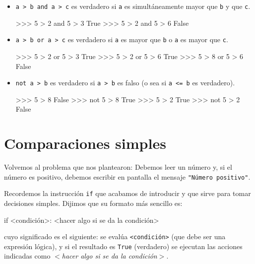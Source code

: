 \begin{itemize}
\item \lstinline!a > b and a > c! es verdadero si \lstinline!a! es
simultáneamente mayor que \lstinline!b! y que \lstinline!c!.

\begin{codigo-python-sn}
>>> 5 > 2 and 5 > 3
True
>>> 5 > 2 and 5 > 6
False
\end{codigo-python-sn}

\item \lstinline!a > b or a > c! es verdadero si \lstinline!a! es mayor que
\lstinline!b! o \lstinline!a! es mayor que \lstinline!c!.

\begin{codigo-python-sn}
>>> 5 > 2 or 5 > 3
True
>>> 5 > 2 or 5 > 6
True
>>> 5 > 8 or 5 > 6
False
\end{codigo-python-sn}

\item \lstinline!not a > b! es verdadero si \lstinline!a > b! es falso (o
sea si \lstinline!a <= b! es verdadero).

\begin{codigo-python-sn}
>>> 5 > 8
False
>>> not 5 > 8
True
>>> 5 > 2
True
>>> not 5 > 2
False
\end{codigo-python-sn}

\end{itemize}

\section{Comparaciones simples}

Volvemos al problema que nos plantearon: Debemos leer un número y, si el
número es positivo, debemos escribir en pantalla el mensaje
 \lstinline!"Número positivo"!.

Recordemos la instrucción \lstinline!if! que acabamos de introducir y que sirve
para tomar decisiones simples. Dijimos que su formato más sencillo es:

\begin{codigo-python-sn}
if <condición>:
    <hacer algo si se da la condición>
\end{codigo-python-sn}

cuyo significado es el siguiente:
se evalúa \lstinline+<condición>+ (que debe ser una expresión lógica), y si el resultado es \lstinline!True! (verdadero) se
ejecutan las acciones indicadas como \emph{$<$hacer algo si se da la condición$>$}.

